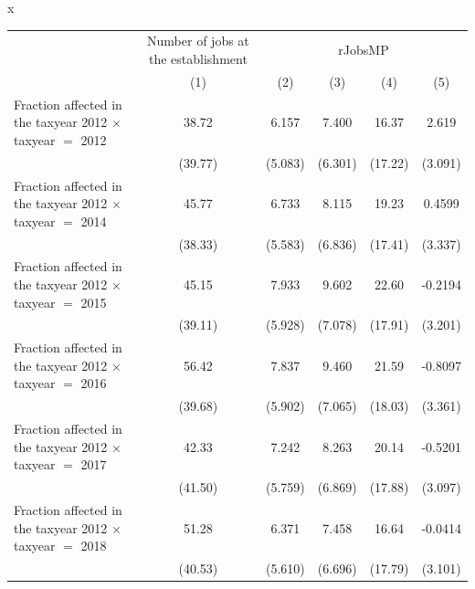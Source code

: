 x
\begingroup
\centering
\begin{tabular}{lccccc}
   \toprule
    & Number of jobs at the establishment & \multicolumn{4}{c}{rJobsMP}\\
                                                                    & (1)           & (2)           & (3)           & (4)           & (5)\\  
   \midrule 
   Fraction affected in the taxyear 2012 $\times$ taxyear $=$ 2012  & 38.72         & 6.157         & 7.400         & 16.37         & 2.619\\   
                                                                    & (39.77)       & (5.083)       & (6.301)       & (17.22)       & (3.091)\\   
   Fraction affected in the taxyear 2012 $\times$ taxyear $=$ 2014  & 45.77         & 6.733         & 8.115         & 19.23         & 0.4599\\   
                                                                    & (38.33)       & (5.583)       & (6.836)       & (17.41)       & (3.337)\\   
   Fraction affected in the taxyear 2012 $\times$ taxyear $=$ 2015  & 45.15         & 7.933         & 9.602         & 22.60         & -0.2194\\   
                                                                    & (39.11)       & (5.928)       & (7.078)       & (17.91)       & (3.201)\\   
   Fraction affected in the taxyear 2012 $\times$ taxyear $=$ 2016  & 56.42         & 7.837         & 9.460         & 21.59         & -0.8097\\   
                                                                    & (39.68)       & (5.902)       & (7.065)       & (18.03)       & (3.361)\\   
   Fraction affected in the taxyear 2012 $\times$ taxyear $=$ 2017  & 42.33         & 7.242         & 8.263         & 20.14         & -0.5201\\   
                                                                    & (41.50)       & (5.759)       & (6.869)       & (17.88)       & (3.097)\\   
   Fraction affected in the taxyear 2012 $\times$ taxyear $=$ 2018  & 51.28         & 6.371         & 7.458         & 16.64         & -0.0414\\   
                                                                    & (40.53)       & (5.610)       & (6.696)       & (17.79)       & (3.101)\\   

\end{tabular}
